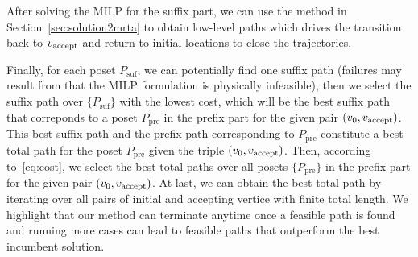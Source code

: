 \documentclass[Afour,sageh,times]{sagej}
\newcommand{\clause}[1]{\mathsf{cls}(#1)}
\newcommand{\vertex}[1]{v_{\textup{#1}}}
\newcommand{\ag}[2]{\langle#1,#2\rangle}
\renewcommand{\ap}[3]{\mathcal{\pi}_{{#1},{#2}}^{#3}}
\begin{document}
{{%


After solving the MILP for the suffix part, we can use the method in Section~\ref{sec:solution2mrta} to obtain low-level paths which drives the transition back to $\vertex{accept}$ and return to initial locations to close the trajectories.



{Finally, for each poset $P_{\text{suf}}$, we can potentially find one suffix path (failures may result from that the MILP formulation is physically infeasible), then we select the suffix path over $\{P_{\text{suf}}\}$ with the lowest cost, which will be the best suffix path that correponds to a poset $P_{\text{pre}}$ in the prefix part for the given pair $(v_0, \vertex{accept})$. This best suffix path and the prefix path corresponding to $P_{\text{pre}}$ constitute a best total path for the poset $P_{\text{pre}}$ given the triple $(v_0, \vertex{accept})$. Then, according to~\eqref{eq:cost}, we select the best total paths over all posets $\{P_{\text{pre}}\}$ in the prefix part for the given pair $(v_0, \vertex{accept})$.  At last, we can obtain the best total path by iterating over all pairs of initial and accepting vertice with finite total length. We highlight that our method can terminate anytime once a feasible path is found and running more cases can lead to feasible paths that outperform the best incumbent solution.
}

}}
\end{document}

